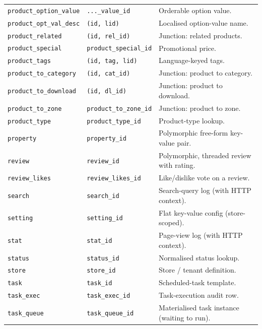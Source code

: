 \documentclass[11pt,a4paper]{article}
\begin{document}
\begin{longtable}{>{\raggedright\arraybackslash}p{4.7cm}>{\raggedright\arraybackslash}p{3.4cm}>{\raggedright\arraybackslash}p{6.3cm}}
\texttt{product\_option\_value}  & \texttt{...\_value\_id} & Orderable option value. \\
\texttt{product\_opt\_val\_desc}   & \texttt{(id, lid)} & Localised option-value name. \\
\texttt{product\_related}        & \texttt{(id, rel\_id)} & Junction: related products. \\
\texttt{product\_special}        & \texttt{product\_special\_id} & Promotional price. \\
\texttt{product\_tags}           & \texttt{(id, tag, lid)} & Language-keyed tags. \\
\texttt{product\_to\_category}   & \texttt{(id, cat\_id)} & Junction: product to category. \\
\texttt{product\_to\_download}   & \texttt{(id, dl\_id)} & Junction: product to download. \\
\texttt{product\_to\_zone}       & \texttt{product\_to\_zone\_id} & Junction: product to zone. \\
\texttt{product\_type}           & \texttt{product\_type\_id}  & Product-type lookup. \\
\texttt{property}                & \texttt{property\_id}       & Polymorphic free-form key-value pair. \\
\texttt{review}                  & \texttt{review\_id}         & Polymorphic, threaded review with rating. \\
\texttt{review\_likes}           & \texttt{review\_likes\_id}  & Like/dislike vote on a review. \\
\texttt{search}                  & \texttt{search\_id}         & Search-query log (with HTTP context). \\
\texttt{setting}                 & \texttt{setting\_id}        & Flat key-value config (store-scoped). \\
\texttt{stat}                    & \texttt{stat\_id}           & Page-view log (with HTTP context). \\
\texttt{status}                  & \texttt{status\_id}         & Normalised status lookup. \\
\texttt{store}                   & \texttt{store\_id}          & Store / tenant definition. \\
\texttt{task}                    & \texttt{task\_id}           & Scheduled-task template. \\
\texttt{task\_exec}              & \texttt{task\_exec\_id}     & Task-execution audit row. \\
\texttt{task\_queue}             & \texttt{task\_queue\_id}    & Materialised task instance (waiting to run). \\

\end{longtable}
\end{document}
